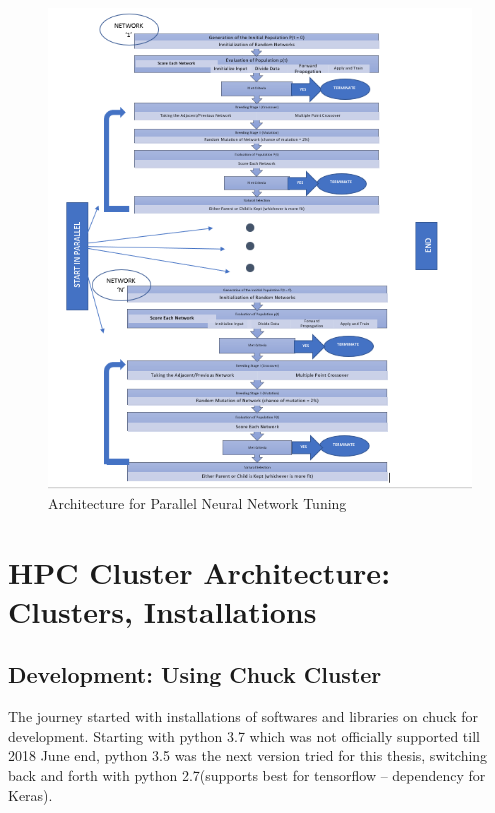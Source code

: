 \begin{figure}
	\centering
	\includegraphics[width=1.0\columnwidth]{introduction/fig3d.png}
	\caption{Architecture for Parallel Neural Network Tuning}
\end{figure}




\section{HPC Cluster Architecture: Clusters, Installations}

\subsection{Development: Using Chuck Cluster}
The journey started with installations of softwares and libraries on chuck for development. Starting with python 3.7 which was not officially supported till 2018 June end, python 3.5 was the next version tried for this thesis, switching back and forth with python 2.7(supports best for tensorflow – dependency for Keras).


